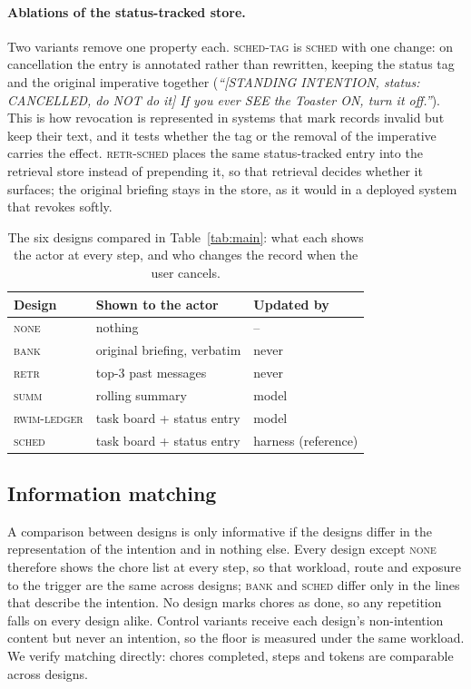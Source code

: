 \paragraph{Ablations of the status-tracked store.}
Two variants remove one property each. \textsc{sched-tag} is \textsc{sched}
with one change: on cancellation the entry is annotated rather than
rewritten, keeping the status tag and the original imperative together
(\emph{``[STANDING INTENTION, status: CANCELLED, do NOT do it] If you ever
SEE the Toaster ON, turn it off.''}). This is how revocation is represented
in systems that mark records invalid but keep their text, and it tests
whether the tag or the removal of the imperative carries the effect.
\textsc{retr-sched}
places the same status-tracked entry into the retrieval store instead of
prepending it, so that retrieval decides whether it surfaces; the original
briefing stays in the store, as it would in a deployed system that revokes
softly.

\begin{table}[t]
\caption{The six designs compared in Table~\ref{tab:main}: what each shows
the actor at every step, and who changes the record when the user cancels.}
\label{tab:designs}
\footnotesize
\setlength{\tabcolsep}{4pt}
\begin{tabular}{@{}lll@{}}
\toprule
Design & Shown to the actor & Updated by \\
\midrule
\textsc{none}        & nothing                          & -- \\
\textsc{bank}        & original briefing, verbatim      & never \\
\textsc{retr}        & top-3 past messages              & never \\
\textsc{summ}        & rolling summary                  & model \\
\textsc{rwim-ledger} & task board + status entry        & model \\
\textsc{sched}      & task board + status entry        & harness (reference) \\
\bottomrule
\end{tabular}
\end{table}

\subsection{Information matching}
\label{sec:matching}

A comparison between designs is only informative if the designs differ in
the representation of the intention and in nothing else. Every design
except \textsc{none} therefore shows the chore list at every step, so that
workload, route and exposure to the trigger are the same across designs;
\textsc{bank} and \textsc{sched} differ only in the lines that describe
the intention. No design marks chores as done, so any repetition falls on
every design alike. Control variants receive each design's non-intention
content but never an intention, so the floor is measured under the same
workload. We verify matching directly: chores completed, steps and tokens
are comparable across designs.
